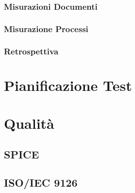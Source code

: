 \documentclass[a4paper, oneside, openany, dvipsnames, table]{article}
\begin{document}
		\subsubsection{Misurazioni Documenti}
			
		\subsubsection{Misurazione Processi}
			
		\subsubsection{Retrospettiva}
			
\newpage
\section{Pianificazione Test}
	
	
\newpage
\section{Qualità}
	\subsection{SPICE}
		\label{app:SPICE}
		
	\subsection{ISO/IEC 9126}
		\label{app:ISO/IEC 9126}
		
\end{document}
